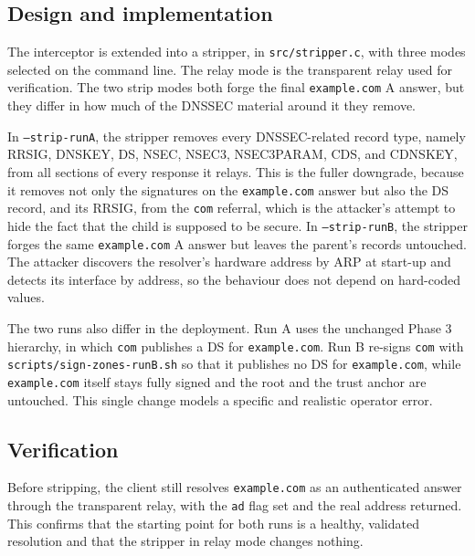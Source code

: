\documentclass[11pt]{article}
\begin{document}
\subsection{Design and implementation}

The interceptor is extended into a stripper, in \texttt{src/stripper.c}, with
three modes selected on the command line. The relay mode is the transparent relay
used for verification. The two strip modes both forge the final
\texttt{example.com} A answer, but they differ in how much of the DNSSEC material
around it they remove.

In \texttt{--strip-runA}, the stripper removes every DNSSEC-related record type,
namely RRSIG, DNSKEY, DS, NSEC, NSEC3, NSEC3PARAM, CDS, and CDNSKEY, from all
sections of every response it relays. This is the fuller downgrade, because it
removes not only the signatures on the \texttt{example.com} answer but also the DS
record, and its RRSIG, from the \texttt{com} referral, which is the attacker's
attempt to hide the fact that the child is supposed to be secure. In
\texttt{--strip-runB}, the stripper forges the same \texttt{example.com} A answer
but leaves the parent's records untouched. The attacker discovers the resolver's
hardware address by ARP at start-up and detects its interface by address, so the
behaviour does not depend on hard-coded values.

The two runs also differ in the deployment. Run A uses the unchanged Phase 3
hierarchy, in which \texttt{com} publishes a DS for \texttt{example.com}. Run B
re-signs \texttt{com} with \texttt{scripts/sign-zones-runB.sh} so that it publishes
no DS for \texttt{example.com}, while \texttt{example.com} itself stays fully
signed and the root and the trust anchor are untouched. This single change models a
specific and realistic operator error.

\subsection{Verification}

Before stripping, the client still resolves \texttt{example.com} as an
authenticated answer through the transparent relay, with the \texttt{ad} flag set
and the real address returned. This confirms that the starting point for both runs
is a healthy, validated resolution and that the stripper in relay mode changes
nothing.

\end{document}
